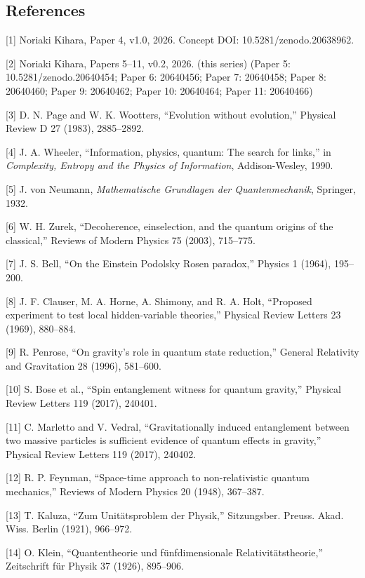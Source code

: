 \documentclass[
]{ltjsarticle}
\begin{document}
\subsection{References}\label{references}

{[}1{]} Noriaki Kihara, Paper 4, v1.0, 2026. Concept DOI:
10.5281/zenodo.20638962.

{[}2{]} Noriaki Kihara, Papers 5--11, v0.2, 2026. (this series) (Paper
5: 10.5281/zenodo.20640454; Paper 6: 20640456; Paper 7: 20640458; Paper
8: 20640460; Paper 9: 20640462; Paper 10: 20640464; Paper 11: 20640466)

{[}3{]} D. N. Page and W. K. Wootters, ``Evolution without evolution,''
Physical Review D 27 (1983), 2885--2892.

{[}4{]} J. A. Wheeler, ``Information, physics, quantum: The search for
links,'' in \emph{Complexity, Entropy and the Physics of Information},
Addison-Wesley, 1990.

{[}5{]} J. von Neumann, \emph{Mathematische Grundlagen der
Quantenmechanik}, Springer, 1932.

{[}6{]} W. H. Zurek, ``Decoherence, einselection, and the quantum
origins of the classical,'' Reviews of Modern Physics 75 (2003),
715--775.

{[}7{]} J. S. Bell, ``On the Einstein Podolsky Rosen paradox,'' Physics
1 (1964), 195--200.

{[}8{]} J. F. Clauser, M. A. Horne, A. Shimony, and R. A. Holt,
``Proposed experiment to test local hidden-variable theories,'' Physical
Review Letters 23 (1969), 880--884.

{[}9{]} R. Penrose, ``On gravity's role in quantum state reduction,''
General Relativity and Gravitation 28 (1996), 581--600.

{[}10{]} S. Bose et al., ``Spin entanglement witness for quantum
gravity,'' Physical Review Letters 119 (2017), 240401.

{[}11{]} C. Marletto and V. Vedral, ``Gravitationally induced
entanglement between two massive particles is sufficient evidence of
quantum effects in gravity,'' Physical Review Letters 119 (2017),
240402.

{[}12{]} R. P. Feynman, ``Space-time approach to non-relativistic
quantum mechanics,'' Reviews of Modern Physics 20 (1948), 367--387.

{[}13{]} T. Kaluza, ``Zum Unitätsproblem der Physik,'' Sitzungsber.
Preuss. Akad. Wiss. Berlin (1921), 966--972.

{[}14{]} O. Klein, ``Quantentheorie und fünfdimensionale
Relativitätstheorie,'' Zeitschrift für Physik 37 (1926), 895--906.
\end{document}
